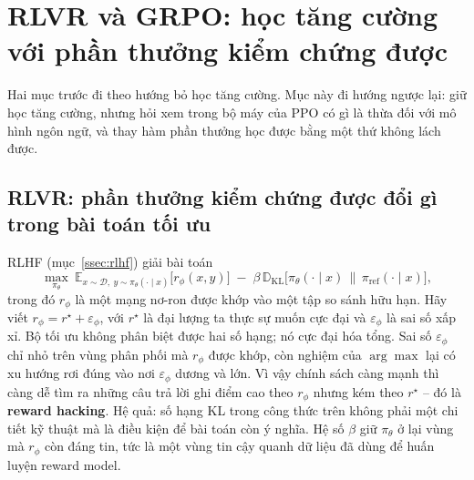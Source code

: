 
\section{RLVR và GRPO: học tăng cường với phần thưởng kiểm chứng được}
\label{sec:rlvr_grpo}

Hai mục trước đi theo hướng bỏ học tăng cường. Mục này đi hướng ngược lại:
giữ học tăng cường, nhưng hỏi xem trong bộ máy của PPO có gì là thừa đối với
mô hình ngôn ngữ, và thay hàm phần thưởng học được bằng một thứ không lách được.

\subsection{RLVR: phần thưởng kiểm chứng được đổi gì trong bài toán tối ưu}
\label{ssec:rlvr}
RLHF (mục~\ref{ssec:rlhf}) giải bài toán
\[
\max_{\pi_\theta}\ \mathbb{E}_{x\sim\mathcal{D},\ y\sim\pi_\theta(\cdot\mid x)}\big[r_\phi(x,y)\big]
\;-\; \beta\,\mathbb{D}_{\mathrm{KL}}\big[\pi_\theta(\cdot\mid x)\,\big\|\,\pi_{\mathrm{ref}}(\cdot\mid x)\big],
\]
trong đó $r_\phi$ là một mạng nơ-ron được khớp vào một tập so sánh hữu hạn. Hãy viết $r_\phi = r^\star + \varepsilon_\phi$, với $r^\star$ là đại lượng ta thực sự muốn cực đại và $\varepsilon_\phi$ là sai số xấp xỉ. Bộ tối ưu không phân biệt được hai số hạng; nó cực đại hóa tổng. Sai số $\varepsilon_\phi$ chỉ nhỏ trên vùng phân phối mà $r_\phi$ được khớp, còn nghiệm của $\arg\max$ lại có xu hướng rơi đúng vào nơi $\varepsilon_\phi$ dương và lớn. Vì vậy chính sách càng mạnh thì càng dễ tìm ra những câu trả lời ghi điểm cao theo $r_\phi$ nhưng kém theo $r^\star$ -- đó là \textbf{reward hacking}. Hệ quả: số hạng KL trong công thức trên không phải một chi tiết kỹ thuật mà là điều kiện để bài toán còn ý nghĩa. Hệ số $\beta$ giữ $\pi_\theta$ ở lại vùng mà $r_\phi$ còn đáng tin, tức là một vùng tin cậy quanh dữ liệu đã dùng để huấn luyện reward model.

